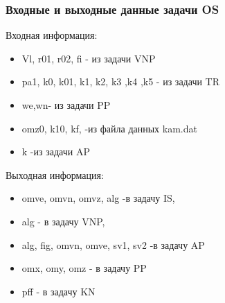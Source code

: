\subsubsection{Входные и выходные данные задачи OS}
Входная информация:
\begin{itemize}
    \item Vl, r01, r02, fi - из задачи  VNP
    \item pa1, k0, k01, k1, k2, k3 ,k4 ,k5 - из задачи   TR
    \item we,wn- из задачи   PP
    \item omz0, k10, kf, -из файла данных kam.dat
    \item k -из задачи AP
\end{itemize}
Выходная информация:
\begin{itemize}
\item omve, omvn, omvz, alg -в задачу IS, 
\item alg - в задачу VNP,
\item alg, fig, omvn, omve, sv1, sv2 -в задачу AP
\item omx, omy, omz - в задачу PP
\item pff - в задачу KN
\end{itemize}
